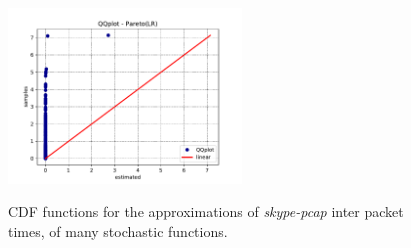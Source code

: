 \begin{figure}[pht!]
{        \includegraphics[width=62mm]{figures/ch4/Skype_QQplot_-_Pareto(LR)}
    }
    \hspace{0mm}
    \caption{CDF functions for the approximations of \textit{skype-pcap} inter packet times, of many stochastic functions.}
    \label{fig:qq-skype}
\end{figure}


